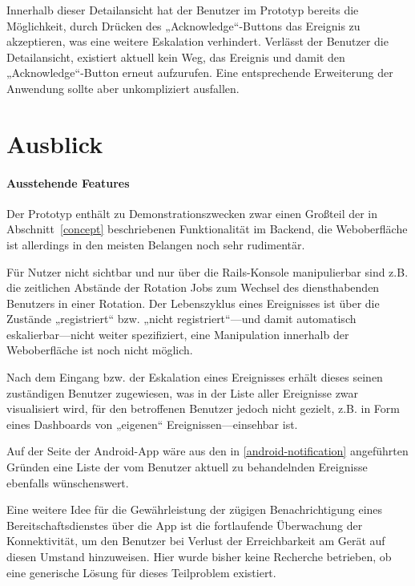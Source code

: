 \documentclass[11pt,utf8,notoc,bibnum,german,final]{zihpub}
\begin{document}
Innerhalb dieser Detailansicht hat der Benutzer im Prototyp bereits die
Möglichkeit, durch Drücken des „Acknowledge“-Buttons das Ereignis zu
akzeptieren, was eine weitere Eskalation verhindert. Verlässt der Benutzer die
Detailansicht, existiert aktuell kein Weg, das Ereignis und damit den
„Acknowledge“-Button erneut aufzurufen. Eine entsprechende Erweiterung der
Anwendung sollte aber unkompliziert ausfallen.


\section{Ausblick}

\paragraph{Ausstehende Features}

Der Prototyp enthält zu Demonstrationszwecken zwar einen Großteil der in
Abschnitt~\ref{concept} beschriebenen Funktionalität im Backend, die
Weboberfläche ist allerdings in den meisten Belangen noch sehr rudimentär.

Für Nutzer nicht sichtbar und nur über die Rails-Konsole manipulierbar sind
z.B. die zeitlichen Abstände der Rotation Jobs zum Wechsel des diensthabenden
Benutzers in einer Rotation. Der Lebenszyklus eines Ereignisses ist über die
Zustände „registriert“ bzw. „nicht registriert“—und damit automatisch
eskalierbar—nicht weiter spezifiziert, eine Manipulation innerhalb der
Weboberfläche ist noch nicht möglich.

Nach dem Eingang bzw. der Eskalation eines Ereignisses erhält dieses seinen
zuständigen Benutzer zugewiesen, was in der Liste aller Ereignisse zwar
visualisiert wird, für den betroffenen Benutzer jedoch nicht gezielt, z.B. in
Form eines Dashboards von „eigenen“ Ereignissen—einsehbar ist.

Auf der Seite der Android-App wäre aus den in \ref{android-notification}
angeführten Gründen eine Liste der vom Benutzer aktuell zu behandelnden
Ereignisse ebenfalls wünschenswert.

Eine weitere Idee für die Gewährleistung der zügigen Benachrichtigung eines
Bereitschaftsdienstes über die App ist die fortlaufende Überwachung der
Konnektivität, um den Benutzer bei Verlust der Erreichbarkeit am Gerät auf
diesen Umstand hinzuweisen. Hier wurde bisher keine Recherche betrieben, ob
eine generische Lösung für dieses Teilproblem existiert.
\end{document}
